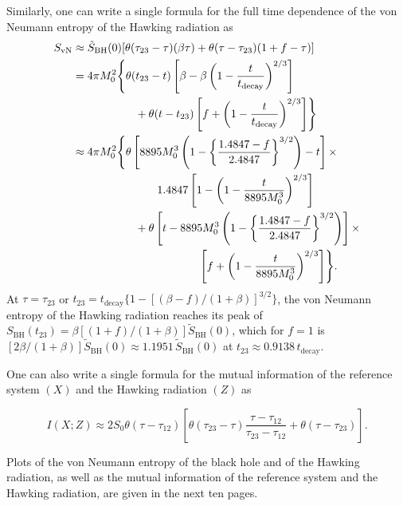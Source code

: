 \documentclass[12pt]{article}
\begin{document}
Similarly, one can write a single formula for the full time dependence of the von Neumann entropy of the Hawking radiation as
\begin{equation}
\begin{split}
S_\mathrm{vN} \approx {} &
\tilde{S}_\mathrm{BH}(0)
[\theta(\tau_{23}-\tau)(\beta\tau) + \theta(\tau-\tau_{23})(1+f-\tau)]
\\
= {} &
4\pi M_0^2
\Biggl\{\theta(t_{23}-t)\left[\beta
-\beta\left(1-\frac{t}{t_\mathrm{decay}}\right)^{2/3}\right]
\\
& \hspace{15mm} +\theta(t-t_{23})\left[f+\left(1-\frac{t}{t_\mathrm{decay}}\right)^{2/3}
\right]\Biggr\}
\\
\approx {} &
4\pi M_0^2 \Biggl\{\theta
\left[
8895 M_0^3\left(1-\left\{\frac{1.4847-f}{2.4847}\right\}^{3/2}\right)-t\right]
\times
\\
& \hspace{22mm}
1.4847\left[1-\left(1-\frac{t}{8895 M_0^3}\right)^{2/3}\right]
\\
& \hspace{15mm}
+\theta\left[t-8895 M_0^3
\left(1-\left\{\frac{1.4847-f}{2.4847}\right\}^{3/2}\right)\right] \times
\\
& \hspace{35mm}
\left[f+\left(1-\frac{t}{8895 M_0^3}\right)^{2/3}\right]\Biggr\}.
\label{impure-rad-von-Neumann-entropy-evolution}
\end{split}
\end{equation}
At $\tau=\tau_{23}$ or $t_{23} = t_\mathrm{decay}\{1 - [(\beta-f)/(1+\beta)]^{3/2}\}$, the von Neumann entropy of the Hawking radiation reaches its peak of $S_\mathrm{BH}(t_{23}) = \beta[(1+f)/(1+\beta)]\tilde{S}_\mathrm{BH}(0)$,
which for $f = 1$ is $[2\beta/(1+\beta)]\tilde{S}_\mathrm{BH}(0) \approx 1.1951\,\tilde{S}_\mathrm{BH}(0)$ at $t_{23} \approx 0.9138\,t_\mathrm{decay}$.

One can also write a single formula for the mutual information of the reference system $(X)$ and the Hawking radiation $(Z)$ as

\begin{equation}
I(X;Z) \approx 2S_0\theta\left(\tau-\tau_{12}\right)
\left[\theta\left(\tau_{23}-\tau\right)
\frac{\tau-\tau_{12}}{\tau_{23}-\tau_{12}}
+\theta\left(\tau-\tau_{23}\right)\right].
\label{mutual-information-evolution}
\end{equation}

Plots of the von Neumann entropy of the black hole and of the Hawking radiation, as well as the mutual information of the reference system and the Hawking radiation, are given in the next ten pages.
\end{document}
